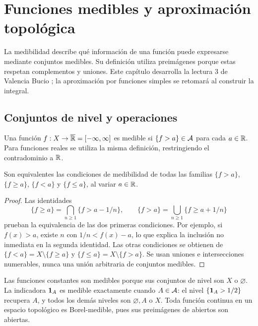 \chapter{Funciones medibles y aproximación topológica}\label{cap:v2-02}
La medibilidad describe qué información de una función puede expresarse mediante conjuntos medibles. Su definición utiliza preimágenes porque estas respetan complementos y uniones. Este capítulo desarrolla la lectura 3 de Valencia Bucio \cite{valencia2}; la aproximación por funciones simples se retomará al construir la integral.

\section{Conjuntos de nivel y operaciones}\label{lectura:v2-03}
\begin{definicion}
Una función $f:X\to\overline{\mathbb R}=[-\infty,\infty]$ es medible si $\{f>a\}\in\mathcal A$ para cada $a\in\mathbb R$. Para funciones reales se utiliza la misma definición, restringiendo el contradominio a $\mathbb R$.
\end{definicion}
\begin{proposicion}\label{prop:v2-niveles}
Son equivalentes las condiciones de medibilidad de todas las familias $\{f>a\}$, $\{f\ge a\}$, $\{f<a\}$ y $\{f\le a\}$, al variar $a\in\mathbb R$.
\end{proposicion}
\begin{proof}
Las identidades
\[\{f\ge a\}=\bigcap_{n\ge1}\{f>a-1/n\},\qquad
\{f>a\}=\bigcup_{n\ge1}\{f\ge a+1/n\}\]
prueban la equivalencia de las dos primeras condiciones. Por ejemplo, si $f(x)>a$, existe $n$ con $1/n<f(x)-a$, lo que explica la inclusión no inmediata en la segunda identidad. Las otras condiciones se obtienen de $\{f<a\}=X\setminus\{f\ge a\}$ y $\{f\le a\}=X\setminus\{f>a\}$. Se usan uniones e intersecciones numerables, nunca una unión arbitraria de conjuntos medibles.
\end{proof}
Las funciones constantes son medibles porque sus conjuntos de nivel son $X$ o $\varnothing$. La indicadora $\mathbf1_{A}$ es medible exactamente cuando $A\in\mathcal A$: el nivel $\{\mathbf1_{A}>1/2\}$ recupera $A$, y todos los demás niveles son $\varnothing,A$ o $X$. Toda función continua en un espacio topológico es Borel-medible, pues sus preimágenes de abiertos son abiertas.

